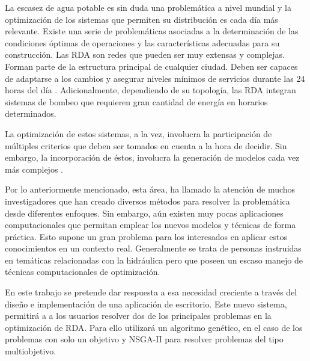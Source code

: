 \documentclass[11pt,letterpaper]{article}
\begin{document}
La escasez de agua potable es sin duda una problemática a nivel mundial y la optimización de los sistemas que permiten su distribución es cada día más relevante. Existe una serie de problemáticas asociadas a la determinación de las condiciones óptimas de operaciones y las características adecuadas para su construcción.
Las RDA son redes que pueden ser muy extensas y complejas. Forman parte de la estructura principal de cualquier ciudad. Deben ser capaces de adaptarse a los cambios y asegurar niveles mínimos de servicios durante las 24 horas del día \cite{Pereyra2017}. Adicionalmente, dependiendo de su topología, las RDA integran sistemas de bombeo que requieren gran cantidad de energía en horarios determinados.

La optimización de estos sistemas, a la vez, involucra la participación de múltiples criterios que deben ser tomados en cuenta a la hora de decidir. Sin embargo, la incorporación de éstos, involucra la generación de modelos cada vez más complejos \cite{JHawanet-2019}.

Por lo anteriormente mencionado, esta área, ha llamado la atención de muchos investigadores que han creado diversos métodos para resolver la problemática desde diferentes enfoques. Sin embargo, aún existen muy pocas aplicaciones computacionales que permitan emplear los nuevos modelos y técnicas de forma práctica. Esto supone un gran problema para los interesados en aplicar estos conocimientos en un contexto real. Generalmente se trata de personas instruidas en temáticas relacionadas con la hidráulica pero que poseen un escaso manejo de técnicas computacionales de optimización.

En este trabajo se pretende dar respuesta a esa necesidad creciente a través del diseño e implementación de una aplicación de escritorio. Este nuevo sistema, permitirá a a los usuarios resolver dos de los principales problemas en la optimización de RDA. Para ello utilizará un algoritmo genético, en el caso de los problemas con solo un objetivo y NSGA-II para resolver problemas del tipo multiobjetivo.




%

\end{document}

